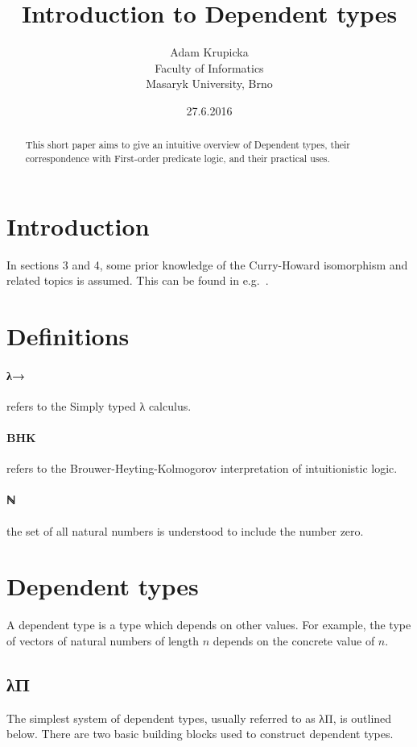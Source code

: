 \documentclass[12pt]{article}
\title{Introduction to Dependent types}
\author{Adam Krupicka\\
        Faculty of Informatics\\
        Masaryk University, Brno
}
\date{27.6.2016}
\begin{document}
\maketitle

\begin{abstract}
This short paper aims to give an intuitive overview of Dependent types, their correspondence with First-order predicate logic, and their practical uses.
\end{abstract} 

\section{Introduction}
In sections 3 and 4, some prior knowledge of the Curry-Howard isomorphism and related topics is assumed. This can be found in e.g.~\cite{mcadams2013tutorial}.

\section{Definitions}
\paragraph{λ→} refers to the Simply typed λ calculus.

\paragraph{BHK} refers to the Brouwer-Heyting-Kolmogorov interpretation of intuitionistic logic.

\paragraph{ℕ} the set of all natural numbers is understood to include the number zero.

\newpage

\section{Dependent types}
A dependent type is a type which depends on other values. For example, the type of vectors of natural numbers of length $n$ depends on the concrete value of $n$.
\subsection{λΠ}
The simplest system of dependent types, usually referred to as λΠ, is outlined below. There are two basic building blocks used to construct dependent types.
\end{document}
